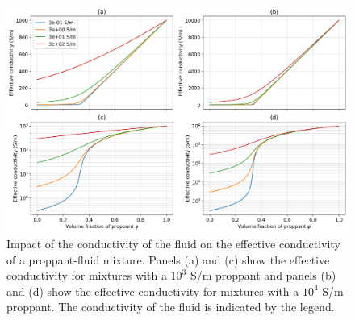 \begin{figure}
    \begin{center}
    \includegraphics[width=\textwidth]{figures/phys_prop_model/emt_fluid.png}
    \end{center}
\caption{
    Impact of the conductivity of the fluid on the effective conductivity of a proppant-fluid mixture.
    Panels (a) and (c) show the effective conductivity for mixtures with a $10^3$ S/m proppant and panels
    (b) and (d) show the effective
    conductivity for mixtures with a $10^4$ S/m proppant. The conductivity of the fluid is indicated by the legend.
}
\label{fig:emt_fluid}
\end{figure}

